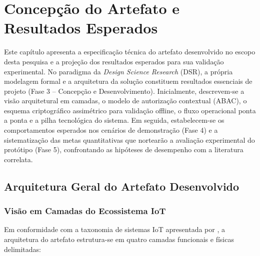 \chapter{Concepção do Artefato e Resultados Esperados}
\label{cap:resultados}

Este capítulo apresenta a especificação técnica do artefato desenvolvido no escopo desta pesquisa e a projeção dos resultados esperados para sua validação experimental. No paradigma da \textit{Design Science Research} (DSR), a própria modelagem formal e a arquitetura da solução constituem resultados essenciais de projeto (Fase 3 -- Concepção e Desenvolvimento). Inicialmente, descrevem-se a visão arquitetural em camadas, o modelo de autorização contextual (ABAC), o esquema criptográfico assimétrico para validação offline, o fluxo operacional ponta a ponta e a pilha tecnológica do sistema. Em seguida, estabelecem-se os comportamentos esperados nos cenários de demonstração (Fase 4) e a sistematização das metas quantitativas que nortearão a avaliação experimental do protótipo (Fase 5), confrontando as hipóteses de desempenho com a literatura correlata.

\section{Arquitetura Geral do Artefato Desenvolvido}
\label{sec:arquitetura-geral}

\subsection{Visão em Camadas do Ecossistema IoT}
\label{subsec:arquitetura-camadas}

Em conformidade com a taxonomia de sistemas IoT apresentada por , a arquitetura do artefato estrutura-se em quatro camadas funcionais e físicas delimitadas:

